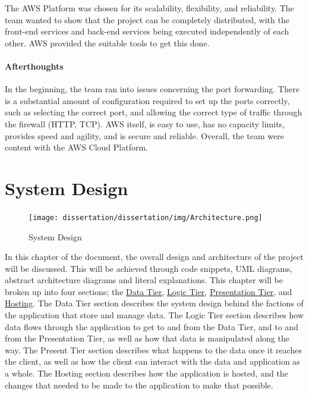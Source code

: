\bigskip

The AWS Platform was chosen for its scalability, flexibility, and reliability. The team wanted to show that the project can be completely distributed, with the front-end services and back-end services being executed independently of each other. AWS provided the suitable tools to get this done.


\subsubsection{Afterthoughts}
In the beginning, the team ran into issues concerning the port forwarding. There is a substantial amount of configuration required to set up the ports correctly, such as selecting the correct port, and allowing the correct type of traffic through the firewall (HTTP, TCP). AWS itself, is easy to use, has no capacity limits, provides speed and agility, and is secure and reliable. Overall, the team were content with the AWS Cloud Platform.

\chapter{System Design}
\label{sec:SystemDesign}


\begin{figure}[H]
    \centering
    \texttt{[image: dissertation/dissertation/img/Architecture.png]}
    \caption{System Design}
    \label{fig:my_label}
\end{figure}

\bigskip
In this chapter of the document, the overall design and architecture of the project will be discussed.  This will be achieved through code snippets, UML diagrams, abstract architecture diagrams and literal explanations. This chapter will be broken up into four sections; the  \hyperref[sec:SystemDesignDataTier]{\underline{Data Tier}}, \hyperref[sec:SystemDesignLogic]{\underline{Logic Tier}}, \hyperref[sec:SystemDesignPresentationTier]{\underline{Presentation Tier}}, and \hyperref[sec:SystemDesignHosting]{\underline{Hosting}}. The Data Tier section describes the system design behind the factions of the application that store and manage data. The Logic Tier section describes how data flows through the application to get to and from the Data Tier, and to and from the Presentation Tier, as well as how that data is manipulated along the way. The Present Tier section describes what happens to the data once it reaches the client, as well as how the client can interact with the data and application as a whole. The Hosting section describes how the application is hosted, and the changes that needed to be made to the application to make that possible.



